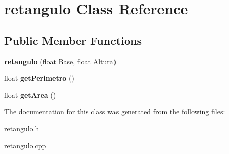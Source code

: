 \hypertarget{classretangulo}{}\section{retangulo Class Reference}
\label{classretangulo}
\subsection*{Public Member Functions}
\begin{DoxyCompactItemize}
\item 
\mbox{\label{classretangulo_a73af5a662bc6e654c7507ba72cfcb618}} 
{\bfseries retangulo} (float Base, float Altura)
\item 
\mbox{\label{classretangulo_a4179fe202f792944875044f1853f16bf}} 
float {\bfseries get\+Perimetro} ()
\item 
\mbox{\label{classretangulo_a19ac519a86f37f6dfb460cbfd4e6004b}} 
float {\bfseries get\+Area} ()
\end{DoxyCompactItemize}


The documentation for this class was generated from the following files\+:\begin{DoxyCompactItemize}
\item 
retangulo.\+h\item 
retangulo.\+cpp\end{DoxyCompactItemize}
